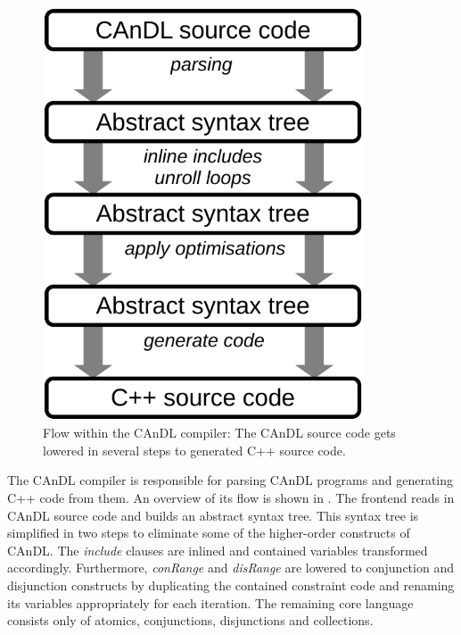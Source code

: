 \begin{figure}[t]
\centering
\begin{minipage}{0.7\textwidth}
\centering
\includegraphics[width=0.85\textwidth]{figures/candlstages.pdf}
\caption{Flow within the CAnDL compiler:
         The CAnDL source code gets lowered in several steps to generated C++
         source code.}
\label{fig:compilerflow}
\end{minipage}
\end{figure}

    The CAnDL compiler is responsible for parsing CAnDL programs and
    generating C++ code from them.
    An overview of its  flow is shown in .
    The frontend reads in  CAnDL source code and builds an abstract syntax tree.
    This syntax tree is simplified in two steps to eliminate some of the
    higher-order constructs of CAnDL.
    The {\it include} clauses are inlined and contained variables
    transformed accordingly.
    Furthermore, {\it conRange} and {\it disRange} are lowered to
    conjunction and disjunction constructs by duplicating the contained
    constraint code and renaming its variables appropriately for each iteration.
    The remaining core language consists only of atomics, conjunctions,
    disjunctions and collections.

